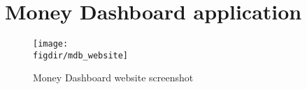 
\section{Money Dashboard application}%
\label{sec:money_dashboard_application}

\begin{figure}[htpb]
    \centering
    \caption{Money Dashboard website screenshot}%
    \texttt{[image: \\figdir/mdb\_website]}
    \label{fig:mdb_website}
\end{figure}

